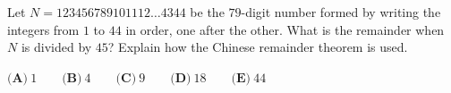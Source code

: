 Let $N=123456789101112\dots4344$ be the $79$-digit number formed by writing the integers from $1$ to $44$ in order, one after the other. What is the remainder when $N$ is divided by $45$? Explain how the Chinese remainder theorem is used.

$\textbf{(A)}\ 1\qquad\textbf{(B)}\ 4\qquad\textbf{(C)}\ 9\qquad\textbf{(D)}\ 18\qquad\textbf{(E)}\ 44$
